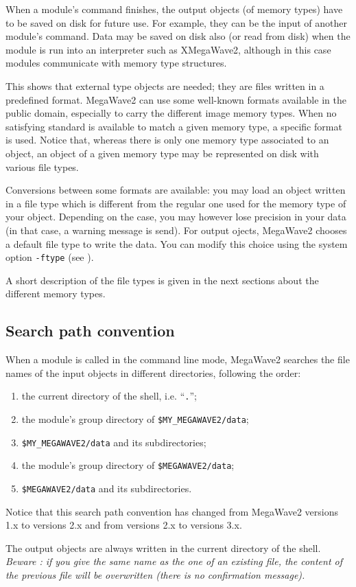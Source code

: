 
When a module's command finishes, the output objects (of memory types) have to be saved on disk for future use.
For example, they can be the input of another module's command.
Data may be saved on disk also (or read from disk) when the module is run
into an interpreter such as XMegaWave2, although in this case modules communicate with memory type structures.

This shows that external type objects are needed; they are files written in a predefined format.
MegaWave2 can use some well-known formats available in the public domain, especially to carry the different image memory types.
When no satisfying standard is available to match a given memory type, a specific format is used.
Notice that, whereas there is only one memory type associated to an object, an object of a given memory type may be represented on disk with various file types.

Conversions between some formats are available: you may load an object written
in a file type which is different from the regular one used for the memory type of your object. Depending on the case, you may however lose precision in your data
(in that case, a warning message is send).
For output ojects, MegaWave2 chooses a default file type to write the data.
You can modify this choice using the system option \verb+-ftype+ (see \volI).

A short description of the file types is given in the next sections about the different memory types.

\subsection{Search path convention}

When a module is called in the command line mode, MegaWave2 searches the file names of the input objects in different directories, following the order:
\begin{enumerate}
\item the current directory of the shell, i.e. ``\verb+.+'';
\item the module's group directory of \verb+$MY_MEGAWAVE2/data+;
\item \verb+$MY_MEGAWAVE2/data+ and its subdirectories;
\item the module's group directory of \verb+$MEGAWAVE2/data+;
\item \verb+$MEGAWAVE2/data+ and its subdirectories.
\end{enumerate}
Notice that this search path convention has changed from MegaWave2 versions 1.x to versions 2.x and
from versions 2.x to versions 3.x.

The output objects are always written in the current directory of the shell.
{\em Beware :
 if you give the same name as the one of an existing file, the content of the previous file will be overwritten 
(there is no confirmation message).}




